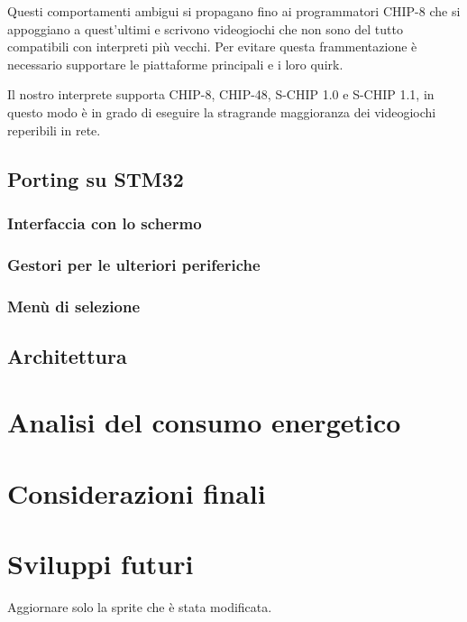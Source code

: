 \documentclass[a4paper]{article}
\begin{document}
Questi comportamenti ambigui si propagano fino ai programmatori
CHIP-8 che si appoggiano a quest'ultimi e scrivono videogiochi che
non sono del tutto compatibili con interpreti più vecchi. Per evitare
questa frammentazione è necessario supportare le piattaforme
principali e i loro quirk.

Il nostro interprete supporta CHIP-8, CHIP-48, S-CHIP 1.0 e
S-CHIP 1.1, in questo modo è in grado di eseguire la stragrande
maggioranza dei videogiochi reperibili in rete.

\subsection{Porting su STM32}

\subsubsection{Interfaccia con lo schermo}

\subsubsection{Gestori per le ulteriori periferiche}

\subsubsection{Menù di selezione}

\subsection{Architettura}




\section{Analisi del consumo energetico} %


\section{Considerazioni finali} %

\section{Sviluppi futuri}

Aggiornare solo la sprite che è stata modificata.




\end{document}
